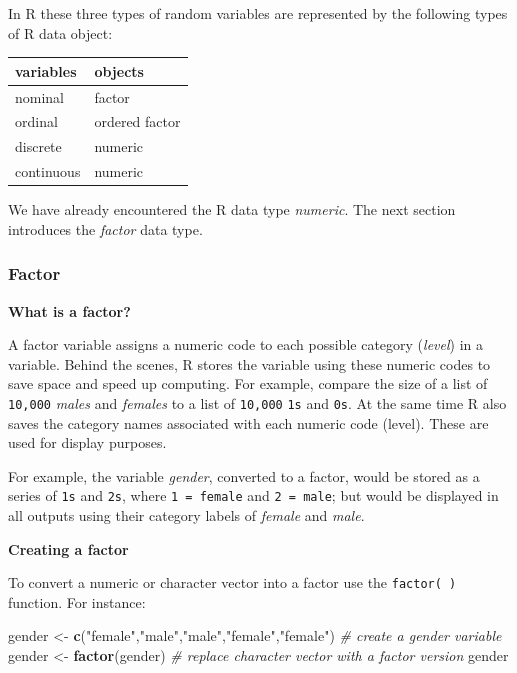 \documentclass[]{book}
\newenvironment{Shaded}{\begin{snugshade}}{\end{snugshade}}
\newcommand{\CommentTok}[1]{\textcolor[rgb]{0.56,0.35,0.01}{\textit{#1}}}
\newcommand{\KeywordTok}[1]{\textcolor[rgb]{0.13,0.29,0.53}{\textbf{#1}}}
\newcommand{\NormalTok}[1]{#1}
\newcommand{\StringTok}[1]{\textcolor[rgb]{0.31,0.60,0.02}{#1}}
\begin{document}
In R these three types of random variables are represented by the following types of R data object:

\begin{tabular}{l|l}
\hline
variables & objects\\
\hline
nominal & factor\\
\hline
ordinal & ordered factor\\
\hline
discrete & numeric\\
\hline
continuous & numeric\\
\hline
\end{tabular}

We have already encountered the R data type \emph{numeric}. The next section introduces the \emph{factor} data type.

\hypertarget{factor}{%
\subsubsection{Factor}\label{factor}}

\textbf{What is a factor?}

A factor variable assigns a numeric code to each possible category (\emph{level}) in a variable. Behind the scenes, R stores the variable using these numeric codes to save space and speed up computing. For example, compare the size of a list of \texttt{10,000} \emph{males} and \emph{females} to a list of \texttt{10,000} \texttt{1s} and \texttt{0s}. At the same time R also saves the category names associated with each numeric code (level). These are used for display purposes.

For example, the variable \emph{gender}, converted to a factor, would be stored as a series of \texttt{1s} and \texttt{2s}, where \texttt{1\ =\ female} and \texttt{2\ =\ male}; but would be displayed in all outputs using their category labels of \emph{female} and \emph{male}.

\textbf{Creating a factor}

To convert a numeric or character vector into a factor use the \texttt{factor(\ )} function. For instance:

\begin{Shaded}
\begin{Highlighting}[]
\NormalTok{gender <-}\StringTok{ }\KeywordTok{c}\NormalTok{(}\StringTok{"female"}\NormalTok{,}\StringTok{"male"}\NormalTok{,}\StringTok{"male"}\NormalTok{,}\StringTok{"female"}\NormalTok{,}\StringTok{"female"}\NormalTok{) }\CommentTok{# create a gender variable}
\NormalTok{gender <-}\StringTok{ }\KeywordTok{factor}\NormalTok{(gender) }\CommentTok{# replace character vector with a factor version}
\NormalTok{gender}
\end{Highlighting}
\end{Shaded}
\end{document}

